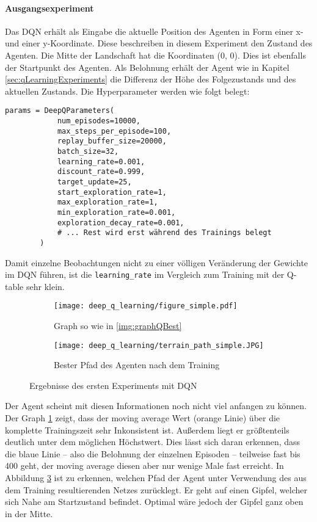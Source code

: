 \paragraph{Ausgangsexperiment}
Das DQN erhält als Eingabe die aktuelle Position des Agenten in Form einer x- und einer y-Koordinate. Diese beschreiben in diesem Experiment den Zustand des Agenten. Die Mitte der Landschaft hat die Koordinaten (0, 0). Dies ist ebenfalls der Startpunkt des Agenten. Als Belohnung erhält der Agent wie in Kapitel \ref{sec:qLearningExperiments} die Differenz der Höhe des Folgezustands und des aktuellen Zustands. Die Hyperparameter werden wie folgt belegt:
\begin{verbatim}
params = DeepQParameters(
            num_episodes=10000,
            max_steps_per_episode=100,
            replay_buffer_size=20000,
            batch_size=32,
            learning_rate=0.001,
            discount_rate=0.999,
            target_update=25,
            start_exploration_rate=1,
            max_exploration_rate=1,
            min_exploration_rate=0.001,
            exploration_decay_rate=0.001,
            # ... Rest wird erst während des Trainings belegt
        )
\end{verbatim}
Damit einzelne Beobachtungen nicht zu einer völligen Veränderung der Gewichte im DQN führen, ist die \texttt{learning_rate} im Vergleich zum Training mit der Q-table sehr klein.
\begin{figure}[h!]
    \centering
    \begin{subfigure}[b]{0.49\textwidth}
        \texttt{[image: deep\_q\_learning/figure\_simple.pdf]}
        \caption{Graph so wie in \ref{img:graphQBest}}
        \label{img:graphDeepQSimple}
    \end{subfigure}
    \begin{subfigure}[b]{0.49\textwidth}
        \texttt{[image: deep\_q\_learning/terrain\_path\_simple.JPG]}
        \caption{Bester Pfad des Agenten nach dem Training}
        \label{img:pathDeepQSimple}
    \end{subfigure}
    \caption{Ergebnisse des ersten Experiments mit DQN}
\end{figure}
Der Agent scheint mit diesen Informationen noch nicht viel anfangen zu können. Der Graph \ref{img:graphDeepQSimple} zeigt, dass der moving average Wert (orange Linie) über die komplette Trainingszeit sehr Inkonsistent ist. Außerdem liegt er größtenteils deutlich unter dem möglichen Höchstwert. Dies lässt sich daran erkennen, dass die blaue Linie -- also die Belohnung der einzelnen Episoden -- teilweise fast bis 400 geht, der moving average diesen aber nur wenige Male fast erreicht. In Abbildung \ref{img:pathDeepQSimple} ist zu erkennen, welchen Pfad der Agent unter Verwendung des aus dem Training resultierenden Netzes zurücklegt. Er geht auf einen Gipfel, welcher sich Nahe am Startzustand befindet. Optimal wäre jedoch der Gipfel ganz oben in der Mitte.

